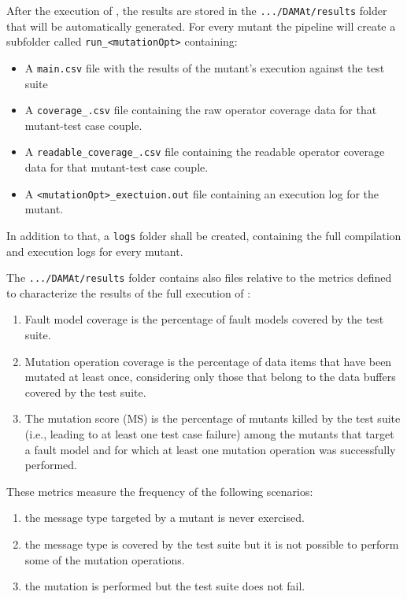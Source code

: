 After the execution of \DAMA, the results are stored in the \texttt{.../DAMAt/results} folder that will be automatically generated.
For every mutant the pipeline will create a subfolder called \texttt{run\_<mutationOpt>} containing:
\begin{itemize}
	\item A \texttt{main.csv} file with the results of the mutant's execution against the test suite
	\item A \texttt{coverage\_<test case>.csv} file containing the raw operator coverage data for that mutant-test case couple.
	\item A \texttt{readable\_coverage\_<test case>.csv} file containing the readable operator coverage data for that mutant-test case couple.
	\item A \texttt{<mutationOpt>\_exectuion.out} file containing an execution log for the mutant.
\end{itemize}

In addition to that, a \texttt{logs} folder shall be created, containing the full compilation and execution logs for every mutant.

The \texttt{.../DAMAt/results} folder contains also files relative to the metrics defined to characterize the results of the full execution of \DAMA:

\begin{enumerate}
	\item Fault model coverage is the percentage of fault models covered by the test suite.
	\item Mutation operation coverage is the percentage of data items that have been mutated at least once, considering only those that belong to the data buffers covered by the test suite.
	\item The mutation score (MS) is the percentage of mutants killed by the test suite (i.e., leading to at least one test case failure) among the mutants that target a fault model and for which at least one mutation operation was successfully performed.
\end{enumerate}

These metrics measure the frequency of the following scenarios:
\begin{enumerate}
	\item the message type targeted by a mutant is never exercised.
	\item the message type is covered by the test suite but it is not possible to perform some of the mutation operations.
	\item the mutation is performed but the test suite does not fail.
\end{enumerate}

